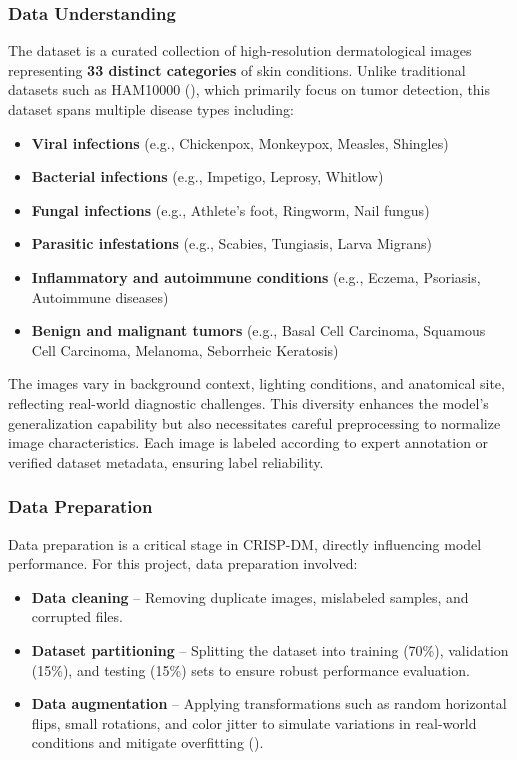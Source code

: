 \documentclass[
  12pt,
  oneside]{article}
\providecommand{\tightlist}{%
  \setlength{\itemsep}{0pt}\setlength{\parskip}{0pt}}
\begin{document}
\subsubsection{Data Understanding}\label{data-understanding}

The dataset is a curated collection of high-resolution dermatological
images representing \textbf{33 distinct categories} of skin conditions.
Unlike traditional datasets such as HAM10000
(), which primarily focus
on tumor detection, this dataset spans multiple disease types including:

\begin{itemize}
\tightlist
\item
  \textbf{Viral infections} (e.g., Chickenpox, Monkeypox, Measles,
  Shingles)
\item
  \textbf{Bacterial infections} (e.g., Impetigo, Leprosy, Whitlow)
\item
  \textbf{Fungal infections} (e.g., Athlete's foot, Ringworm, Nail
  fungus)
\item
  \textbf{Parasitic infestations} (e.g., Scabies, Tungiasis, Larva
  Migrans)
\item
  \textbf{Inflammatory and autoimmune conditions} (e.g., Eczema,
  Psoriasis, Autoimmune diseases)
\item
  \textbf{Benign and malignant tumors} (e.g., Basal Cell Carcinoma,
  Squamous Cell Carcinoma, Melanoma, Seborrheic Keratosis)
\end{itemize}

The images vary in background context, lighting conditions, and
anatomical site, reflecting real-world diagnostic challenges. This
diversity enhances the model's generalization capability but also
necessitates careful preprocessing to normalize image characteristics.
Each image is labeled according to expert annotation or verified dataset
metadata, ensuring label reliability.

\subsubsection{Data Preparation}\label{data-preparation}

Data preparation is a critical stage in CRISP-DM, directly influencing
model performance. For this project, data preparation involved:

\begin{itemize}
\tightlist
\item
  \textbf{Data cleaning} -- Removing duplicate images, mislabeled
  samples, and corrupted files.
\item
  \textbf{Dataset partitioning} -- Splitting the dataset into training
  (70\%), validation (15\%), and testing (15\%) sets to ensure robust
  performance evaluation.
\item
  \textbf{Data augmentation} -- Applying transformations such as random
  horizontal flips, small rotations, and color jitter to simulate
  variations in real-world conditions and mitigate overfitting
  ().
\end{itemize}
\end{document}
